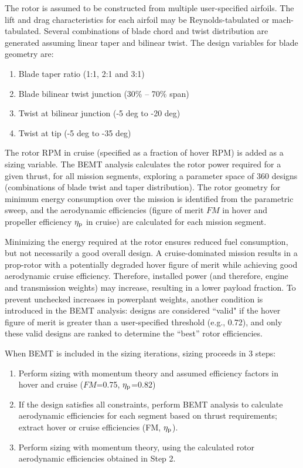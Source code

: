 The rotor is assumed to be constructed from multiple user-specified airfoils. The lift and drag characteristics for each airfoil may be Reynolds-tabulated or mach-tabulated. Several combinations of blade chord and twist distribution are generated assuming linear taper and bilinear twist. The design variables for blade geometry are:
\begin{enumerate}
\item Blade taper ratio (1:1, 2:1 and 3:1)
\item Blade bilinear twist junction (30\% -- 70\% span)
\item Twist at bilinear junction (-5 deg to -20 deg)
\item Twist at tip (-5 deg to -35 deg)
\end{enumerate}
The rotor RPM in cruise (specified as a fraction of hover RPM) is added as a sizing variable. The BEMT analysis calculates the rotor power required for a given thrust, for all mission segments, exploring a parameter space of 360 designs (combinations of blade twist and taper distribution). The rotor geometry for minimum energy consumption over the mission is identified from the parametric sweep, and the aerodynamic efficiencies (figure of merit $FM$ in hover and propeller efficiency $\eta_{\rm p}$ in cruise) are calculated for each mission segment. 

Minimizing the energy required at the rotor ensures reduced fuel consumption, but not necessarily a good overall design. A cruise-dominated mission results in a prop-rotor with a potentially degraded hover figure of merit while achieving good aerodynamic cruise efficiency. Therefore, installed power (and therefore, engine and transmission weights) may increase, resulting in a lower payload fraction. To prevent unchecked increases in powerplant weights, another condition is introduced in the BEMT analysis: designs are considered ``valid" if the hover figure of merit is greater than a user-specified threshold (e.g., 0.72), and only these valid designs are ranked to determine the ``best'' rotor efficiencies.

When BEMT is included in the sizing iterations, sizing proceeds in 3 steps:
\begin{enumerate}
\item Perform sizing with momentum theory and assumed efficiency factors in hover and cruise ($FM$=0.75, $\eta_{\rm p}$=0.82)
\item If the design satisfies all constraints, perform BEMT analysis to calculate aerodynamic efficiencies for each segment based on thrust requirements; extract hover or cruise efficiencies (FM, $\eta_{\rm p}$).
\item Perform sizing with momentum theory, using the calculated rotor aerodynamic efficiencies obtained in Step 2.
\end{enumerate}

